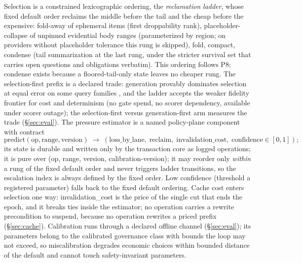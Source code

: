 \documentclass[11pt]{article}
\begin{document}
Selection is a constrained lexicographic ordering, the \emph{reclamation ladder}, whose fixed default order reclaims the middle before the tail and the cheap before the expensive: fold-away of ephemeral items (first droppability rank), placeholder-collapse of unpinned evidential body ranges (parameterized by region; on providers without placeholder tolerance this rung is skipped), fold, compact, condense (tail summarization at the last rung, under the stricter survival set that carries open questions and obligations verbatim). This ordering follows P8; condense exists because a floored-tail-only state leaves no cheaper rung. The selection-first prefix is a declared trade: generation provably dominates selection at equal error on some query families \cite{theory2026}, and the ladder accepts the weaker fidelity frontier for cost and determinism (no gate spend, no scorer dependency, available under scorer outage); the selection-first versus generation-first arm measures the trade (\S\ref{sec:eval}). The pressure estimator is a named policy-plane component with contract
\[
\mathrm{predict}(\mathrm{op}, \mathrm{range}, \mathrm{version}) \;\to\; (\mathrm{loss\_by\_lane},\; \mathrm{reclaim},\; \mathrm{invalidation\_cost},\; \mathrm{confidence} \in [0,1]);
\]
its state is durable and written only by the transaction core as logged operations; it is pure over (op, range, version, calibration-version); it may reorder only \emph{within} a rung of the fixed default order and never triggers ladder transitions, so the escalation index is always defined by the fixed order. Low confidence (threshold a registered parameter) falls back to the fixed default ordering. Cache cost enters selection one way: invalidation\_cost is the price of the single cut that ends the epoch, and it breaks ties inside the estimator; no operation carries a rewrite precondition to suspend, because no operation rewrites a priced prefix (\S\ref{sec:cache}). Calibration runs through a declared offline channel (\S\ref{sec:eval}); its parameters belong to the calibrated governance class with bounds the loop may not exceed, so miscalibration degrades economic choices within bounded distance of the default and cannot touch safety-invariant parameters.
\end{document}
